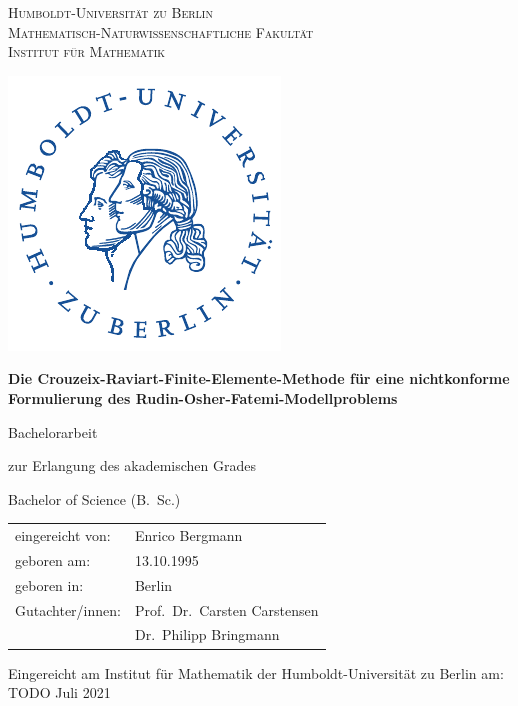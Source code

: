 \begin{titlepage}
  \begin{minipage}{.65\textwidth}
  {\scshape{\Large Humboldt-Universität zu Berlin}\\
  Mathematisch-Naturwissenschaftliche Fakultät\\
  Institut für Mathematik\par}
  \end{minipage}
  \begin{minipage}{.25\textwidth}
    \begin{flushright}
      \includegraphics*[scale=.6]{pictures/logos/husiegel_bw.pdf}
    \end{flushright}
  \end{minipage}

  \centering

  \vspace{3cm}

  {\huge\bfseries Die Crouzeix\--Raviart\--Finite\--Elemente\--Methode für eine
  nichtkonforme Formulierung des Rudin\--Osher\--Fatemi\--Modellproblems\par}

  \vspace{2cm}

  {\huge Bachelorarbeit}

  \vspace{1.5cm}

  {\LARGE zur Erlangung des akademischen Grades}

  \vspace{0.3cm}

  {\LARGE Bachelor of Science (B.\ Sc.)}

  \vspace{3cm}

  \flushleft
  {\LARGE
  \begin{tabular}{ll}
  eingereicht von: &Enrico Bergmann\\
  geboren am: &13.10.1995\\
  geboren in: &Berlin\\
    Gutachter/innen: &Prof.\ Dr.\ Carsten Carstensen\\
    &Dr.\ Philipp Bringmann
  \end{tabular}
  }
  \vfill

  {\small Eingereicht am Institut für Mathematik der Humboldt-Universität zu
  Berlin am: TODO Juli 2021}
\end{titlepage}
